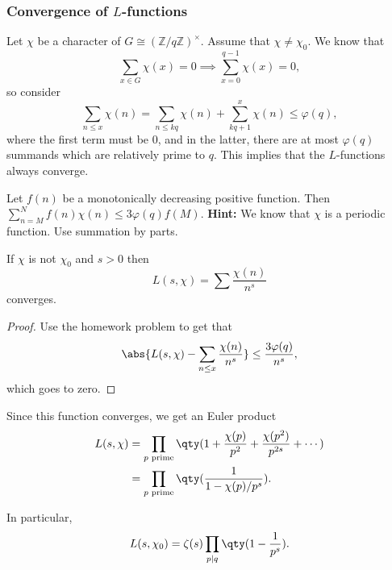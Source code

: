 \subsubsection*{Convergence of \texorpdfstring{$L$}{L}-functions}

Let $\chi$ be a character of $G \cong (\mathbb{Z}/q\mathbb{Z})^\times$.
Assume that $\chi \not= \chi_0$.
We know that 
\[ 
	\sum_{x\in G} \chi(x) = 0 \implies \sum_{x=0}^{q-1} \chi(x) = 0, \tag{by orthogonality}
\]
so consider 
\[ 
	\sum_{n \leq x} \chi(n) = \sum_{n \leq kq} \chi(n) + \sum_{kq+1}^x \chi(n)
	\leq \varphi(q),	
\]
where the first term must be $0$, and in the latter, there are at most 
$\varphi(q)$ summands which are relatively prime to $q$.
This implies that the $L$-functions always converge.

\begin{problem}[Homework]
	Let $f(n)$ be a monotonically decreasing positive function. 
	Then $\sum_{n =M}^N f(n)\chi(n) \leq 3\varphi(q)f(M)$.
	\textbf{Hint:} We know that $\chi$ is a periodic function.
	Use summation by parts.
\end{problem}

\begin{corollary}
	If $\chi$ is not $\chi_0$ and $s > 0$ then 
	\[ L(s,\chi) = \sum \frac{\chi(n)}{n^s} \]
	converges.
\end{corollary}

\begin{proof}
	Use the homework problem to get that 
	\[ \abs{L(s,\chi) - \sum_{n \leq x} \frac{\chi(n)}{n^s}} \leq \frac{3\varphi(q)}{n^s}, \]
	which goes to zero.
\end{proof}

Since this function converges, we get an Euler product
\begin{align*}
	L(s, \chi) &= \prod_{\text{$p$ prime}} \qty(1 + \frac{\chi(p)}{p^2} + \frac{\chi(p^2)}{p^{2s}} + \cdots) \\
	&= \prod_{\text{$p$ prime}} \qty(\frac{1}{1-\chi(p)/p^s}).
\end{align*}

In particular, 
\[ L(s,\chi_0) = \zeta(s)\prod_{p \mid q}\qty(1-\frac{1}{p^s}). \]